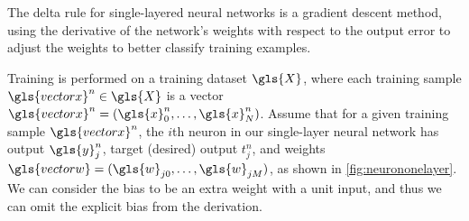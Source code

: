 \documentclass[thesis]{subfiles}
\begin{document}
The delta rule for single-layered neural networks is a gradient descent method, using the derivative of the network's weights with respect to the output error to adjust the weights to better classify training examples.

Training is performed on a training dataset $\gls{X}$, where each training sample $\gls{vectorx}^n\in \gls{X}$ is a vector $\gls{vectorx}^n = (\gls{x}^n_0, \ldots, \gls{x}^n_N)$. Assume that for a given training sample $\gls{vectorx}^n$, the $i$th neuron in our single-layer neural network has output $\gls{y}^n_j$, target (desired) output $t^n_j$, and weights $\gls{vectorw}=(\gls{w}_{j0}, \ldots, \gls{w}_{jM})$, as shown in \cref{fig:neurononelayer}. We can consider the bias to be an extra weight with a unit input, and thus we can omit the explicit bias from the derivation. 
\end{document}
